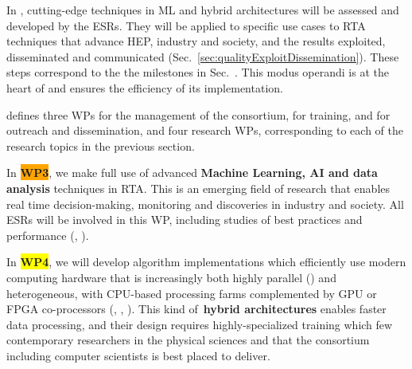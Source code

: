 



In \acronym, cutting-edge techniques in ML and hybrid architectures will be assessed and developed by the ESRs. They will be applied to specific use cases to RTA techniques that advance HEP, industry and society, and the results exploited, disseminated and communicated (Sec.~\ref{sec:qualityExploitDissemination}). These steps correspond to the the milestones in Sec.~\label{sub:milestones}. This modus operandi is at the heart of \acronym and ensures the efficiency of its implementation. 

\acronym defines three WPs for the management of the consortium, for training, and for outreach and dissemination, and four research WPs, corresponding to each of the research topics in the previous section. 

In \textbf{\colorbox{orange}{WP3}}\color{black}, we make full use of advanced \textbf{Machine Learning, AI and data analysis} techniques in RTA. This is an emerging field of research that enables real time decision-making, monitoring and discoveries in industry and society. All ESRs will be involved in this WP, including studies of best practices and performance (\ESRh, \ESRi).

In \textbf{\colorbox{yellow}{WP4}}, we will develop algorithm implementations which efficiently use modern computing hardware that is increasingly both highly parallel (\ESRc) and heterogeneous, with CPU-based processing farms complemented by GPU or FPGA co-processors (\ESRf, \ESRg, \ESRl). 
This kind of~\textbf{hybrid architectures} enables faster data processing, and their design requires highly-specialized training which few contemporary researchers in the physical sciences and that the consortium including computer scientists is best placed to deliver. 

